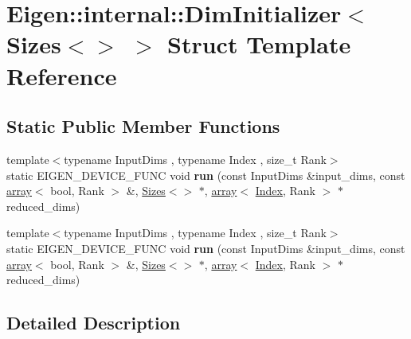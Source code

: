 \hypertarget{struct_eigen_1_1internal_1_1_dim_initializer_3_01_sizes_3_4_01_4}{}\section{Eigen\+:\+:internal\+:\+:Dim\+Initializer$<$ Sizes$<$$>$ $>$ Struct Template Reference}
\label{struct_eigen_1_1internal_1_1_dim_initializer_3_01_sizes_3_4_01_4}
\subsection*{Static Public Member Functions}
\begin{DoxyCompactItemize}
\item 
\mbox{\label{struct_eigen_1_1internal_1_1_dim_initializer_3_01_sizes_3_4_01_4_af44ffe435d5296375a8ffd8b5af72019}} 
{\footnotesize template$<$typename Input\+Dims , typename Index , size\+\_\+t Rank$>$ }\\static E\+I\+G\+E\+N\+\_\+\+D\+E\+V\+I\+C\+E\+\_\+\+F\+U\+NC void {\bfseries run} (const Input\+Dims \&input\+\_\+dims, const \hyperlink{class_eigen_1_1array}{array}$<$ bool, Rank $>$ \&, \hyperlink{struct_eigen_1_1_sizes}{Sizes}$<$$>$ $\ast$, \hyperlink{class_eigen_1_1array}{array}$<$ \hyperlink{namespace_eigen_a62e77e0933482dafde8fe197d9a2cfde}{Index}, Rank $>$ $\ast$reduced\+\_\+dims)
\item 
\mbox{\label{struct_eigen_1_1internal_1_1_dim_initializer_3_01_sizes_3_4_01_4_af44ffe435d5296375a8ffd8b5af72019}} 
{\footnotesize template$<$typename Input\+Dims , typename Index , size\+\_\+t Rank$>$ }\\static E\+I\+G\+E\+N\+\_\+\+D\+E\+V\+I\+C\+E\+\_\+\+F\+U\+NC void {\bfseries run} (const Input\+Dims \&input\+\_\+dims, const \hyperlink{class_eigen_1_1array}{array}$<$ bool, Rank $>$ \&, \hyperlink{struct_eigen_1_1_sizes}{Sizes}$<$$>$ $\ast$, \hyperlink{class_eigen_1_1array}{array}$<$ \hyperlink{namespace_eigen_a62e77e0933482dafde8fe197d9a2cfde}{Index}, Rank $>$ $\ast$reduced\+\_\+dims)
\end{DoxyCompactItemize}


\subsection{Detailed Description}
